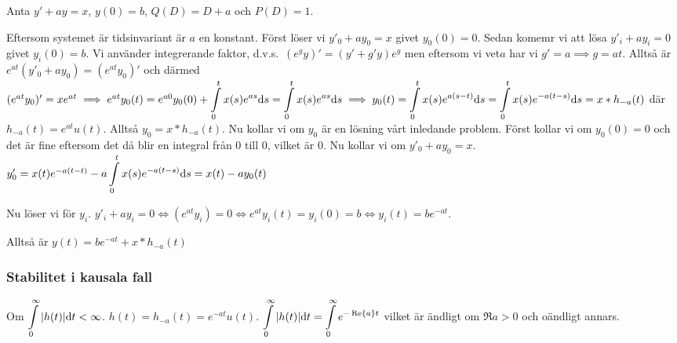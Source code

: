 \documentclass[a4paper]{article}
\begin{document}
\begin{ex}
    Anta \(
        y' + ay = x
    \), \(
        y(0) = b
    \), \(
        Q(D) = D+a
    \) och \(
        P(D) = 1
    \). 
    
    Eftersom systemet är tidsinvariant är \(
        a
    \) en konstant. Först löser vi \(
        y'_0 +ay_0 = x
    \) givet \(
        y_0(0)= 0
    \). Sedan komemr vi att lösa \(
        y'_i +ay_i = 0
    \) givet \(
        y_i(0)= b
    \). Vi använder integrerande faktor, d.v.s.\ \(
        (e^gy)' = (y'+g'y)e^g
    \) men eftersom vi vet\(
        a
    \) har vi \(
        g' = a \implies g = at
    \). Alltså är \(
        e^{at}(y'_0+ay_0) = (e^{at}y_0)'
    \) och därmed \(
        (e^{at}y_0)' = xe^{at} \implies e^{at}y_0(t) = e^{a0}y_0(0) + \displaystyle\int\limits_0^t x(s)e^{as}\dd s 
        = \displaystyle\int\limits_0^t x(s)e^{as}\dd s \implies y_0(t) = \displaystyle\int\limits_0^t x(s)e^{a(s-t)}\dd s
        = \displaystyle\int\limits_0^t x(s)e^{-a(t-s)}\dd s = x * h_{-a}(t) 
    \) där \(
        h_{-a}(t) = e^{at}u(t)
    \). Alltså \(
        y_0 = x * h_{-a}(t)
    \). Nu kollar vi om \(
        y_0
    \) är en lösning vårt inledande problem. Först kollar vi om \(
        y_0(0) = 0
    \) och det är fine eftersom det då blir en integral från \(
        0 
    \) till \(
        0
    \), vilket är \(
        0
    \). Nu kollar vi om \(
        y'_0 + a y_0 = x
    \). \(
        y'_0 = x(t) e^{-a(t-t)} - a \displaystyle\int\limits_0^t x(s) e^{-a(t-s)}\dd s = x(t) - a y_0(t)
    \) 


    Nu löser vi för \(
        y_i
    \). \(
        y'_i + a y_i = 0 \iff (e^{at} y_i) = 0 \iff e^{at}y_i(t) = y_i(0) = b
        \iff y_i(t) = be^{-at}
    \). 
    
    Alltså är \(
        y(t) = be^{-at} + x * h_{-a}(t)
    \) 
\end{ex}


\subsubsection{Stabilitet i kausala fall}
Om \(
    \displaystyle\int\limits_0^\infty \abs{h(t)} \dd t < \infty 
\). \(
    h(t) = h_{-a}(t) = e^{-at}u(t) 
\). \(
    \displaystyle\int\limits_0^\infty \abs{h(t)} \dd t = \displaystyle\int\limits_0^\infty e^{-\Re{a}t} 
\) vilket är ändligt om \(
    \Re{a} > 0
\) och oändligt annars.
\end{document}
